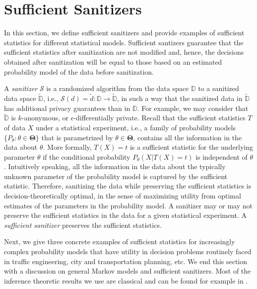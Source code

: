 \documentclass[times,twocolumn,final,authoryear]{elsarticle}
\begin{document}
\section{Sufficient Sanitizers}\label{Sec:SufficientSanitizer}
{\color{blue} In this section, we define sufficient sanitizers and provide examples of sufficient statistics for different statistical models.
Sufficient santizers guarantee that the sufficient statistics after sanitization are not modified and, hence, the decisions obtained after sanitization will be equal to those based on an estimated probability model of the data before sanitization.
}

A {\em sanitizer} $\mathcal{S}$ is a randomized algorithm from the data space $\mathbb{D}$ to a sanitized data space $\widetilde{\mathbb{D}}$, i.e., $\mathcal{S}(d)=\widetilde{d} : \mathbb{D} \to \widetilde{\mathbb{D}}$, in such a way that the sanitized data in $\widetilde{\mathbb{D}}$ has additional privacy guarantees than in $\mathbb{D}$.
{\color{blue} For example, we may consider that  $\widetilde{\mathbb{D}}$ is $k$-anonymous, or $\epsilon$-differentially private.}
Recall that the sufficient statistics $T$ of data $X$ under a statistical experiment, i.e., a family of probability models $\{P_{\theta}: \theta \in \mathbf{\Theta}\}$ that is parametrized by $\theta \in \mathbf{\Theta}$, contains all the information in the data about $\theta$.  
More formally, $T(X)=t$ is a sufficient statistic for the underlying parameter $\theta$ if the conditional probability $P_{\theta}(X | T(X)=t)$ is independent of $\theta$.  
Intuitively speaking, all the information in the data about the typically unknown parameter of the probability model is captured by the sufficient statistic.  
Therefore, sanitizing the data while preserving the sufficient statistics is decision-theoretically optimal, in the sense of maximizing utility from optimal estimates of the parameters in the probability model. 
A sanitizer may or may not preserve the sufficient statistics in the data for a given statistical experiment.
A {\em sufficient sanitizer} preserves the sufficient statistics. 

Next, we give three concrete examples of sufficient statistics for increasingly complex probability models that have utility in decision problems routinely faced in traffic engineering, city and transportation planning, etc.  
We end this section with a discussion on general Markov models and sufficient sanitizers.  Most of the inference theoretic results we use are classical and can be found for example in \cite{Billingsley:1961}.
\end{document}
